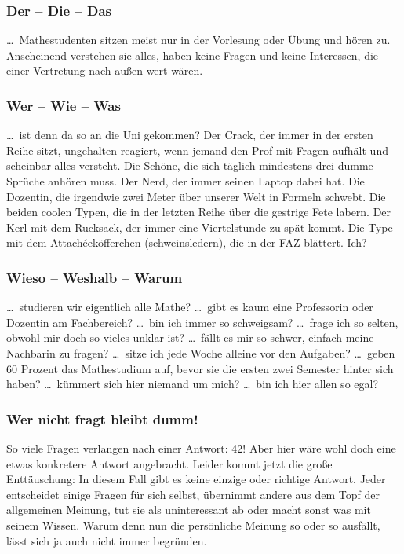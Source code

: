 \subsubsection{Der -- Die -- Das}

\dots\ Mathestudenten sitzen meist nur in der Vorlesung oder Übung und hören
zu.  Anscheinend verstehen sie alles, haben keine Fragen und keine Interessen,
die einer Vertretung nach außen wert wären.

\subsubsection{Wer -- Wie -- Was}

\dots\ ist denn da so an die Uni gekommen? Der Crack, der immer in der ersten
Reihe sitzt, ungehalten reagiert, wenn jemand den Prof mit Fragen aufhält und
scheinbar alles versteht.  Die Schöne, die sich täglich mindestens drei dumme
Sprüche anhören muss. Der Nerd, der immer seinen Laptop dabei hat. Die
Dozentin, die irgendwie zwei Meter über unserer Welt in Formeln schwebt. Die
beiden coolen Typen, die in der letzten Reihe über die gestrige Fete labern.
Der Kerl mit dem Rucksack, der immer eine Viertelstunde zu spät kommt. Die Type
mit dem Attach\'eeköfferchen (schweinsledern), die in der FAZ blättert.  Ich?

\subsubsection{Wieso -- Weshalb -- Warum}

\dots\ studieren wir eigentlich alle Mathe? \dots\ gibt es kaum eine
Professorin oder Dozentin am Fachbereich? \dots\ bin ich immer so schweigsam?
\dots\ frage ich so selten, obwohl mir doch so vieles unklar ist? \dots\ fällt
es mir so schwer, einfach meine Nachbarin zu fragen? \dots\ sitze ich jede
Woche alleine vor den Aufgaben? \dots\ geben 60 Prozent das Mathestudium auf,
bevor sie die ersten zwei Semester hinter sich haben? \dots\ kümmert sich hier
niemand um mich? \dots\ bin ich hier allen so egal?

\subsubsection{Wer nicht fragt bleibt dumm!}

So viele Fragen verlangen nach einer Antwort: 42! Aber hier wäre wohl doch eine
etwas konkretere Antwort angebracht. Leider kommt jetzt die große Enttäuschung:
In diesem Fall gibt es keine einzige oder richtige Antwort. Jeder entscheidet
einige Fragen für sich selbst, übernimmt andere aus dem Topf der allgemeinen
Meinung, tut sie als uninteressant ab oder macht sonst was mit seinem Wissen.
Warum denn nun die persönliche Meinung so oder so ausfällt, lässt sich ja auch
nicht immer begründen.

